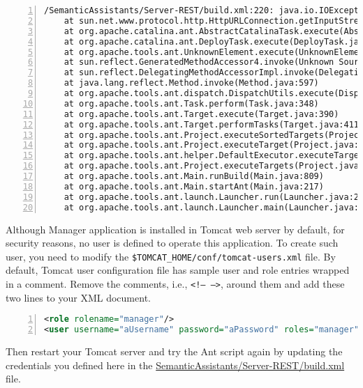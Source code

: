 \begin{lstlisting}[language=XML,numbers=left,xleftmargin=8mm,columns=flexible]
/SemanticAssistants/Server-REST/build.xml:220: java.io.IOException: Server returned HTTP response code: 401 for URL: http://localhost:8080/manager/deploy?path=\%2FSemAssistRestlet
	at sun.net.www.protocol.http.HttpURLConnection.getInputStream(HttpURLConnection.java:1436)
	at org.apache.catalina.ant.AbstractCatalinaTask.execute(AbstractCatalinaTask.java:223)
	at org.apache.catalina.ant.DeployTask.execute(DeployTask.java:201)
	at org.apache.tools.ant.UnknownElement.execute(UnknownElement.java:291)
	at sun.reflect.GeneratedMethodAccessor4.invoke(Unknown Source)
	at sun.reflect.DelegatingMethodAccessorImpl.invoke(DelegatingMethodAccessorImpl.java:25)
	at java.lang.reflect.Method.invoke(Method.java:597)
	at org.apache.tools.ant.dispatch.DispatchUtils.execute(DispatchUtils.java:106)
	at org.apache.tools.ant.Task.perform(Task.java:348)
	at org.apache.tools.ant.Target.execute(Target.java:390)
	at org.apache.tools.ant.Target.performTasks(Target.java:411)
	at org.apache.tools.ant.Project.executeSortedTargets(Project.java:1399)
	at org.apache.tools.ant.Project.executeTarget(Project.java:1368)
	at org.apache.tools.ant.helper.DefaultExecutor.executeTargets(DefaultExecutor.java:41)
	at org.apache.tools.ant.Project.executeTargets(Project.java:1251)
	at org.apache.tools.ant.Main.runBuild(Main.java:809)
	at org.apache.tools.ant.Main.startAnt(Main.java:217)
	at org.apache.tools.ant.launch.Launcher.run(Launcher.java:280)
	at org.apache.tools.ant.launch.Launcher.main(Launcher.java:109)
\end{lstlisting}

Although Manager application is installed in Tomcat web server by default, for security reasons, no user is defined to operate this application. To create such user, you need to modify the \texttt{\$TOMCAT\_HOME/conf/tomcat-users.xml} file. By default, Tomcat user configuration file has sample user and role entries wrapped in a comment. Remove the comments, i.e., \texttt{<!-- -->}, around them and add these two lines to your XML document.

\begin{lstlisting}[language=XML,numbers=left,xleftmargin=8mm,columns=flexible]
<role rolename="manager"/>
<user username="aUsername" password="aPassword" roles="manager"/>
\end{lstlisting}

Then restart your Tomcat server and try the Ant script again by updating the credentials you defined here in the \url{SemanticAssistants/Server-REST/build.xml} file.

